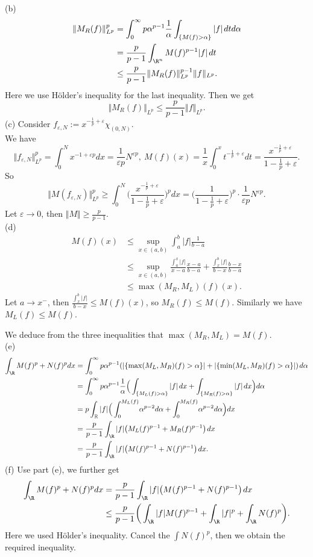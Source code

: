 \begin{itemize}
(b)
\begin{align*}
\Vert M_R(f)\Vert_{L^p}^p
&=\int_0^\infty p\alpha^{p-1}\frac1\alpha\int_{\{M(f)>\alpha\}}\vert f\vert\>dtd\alpha\\
&=\frac{p}{p-1}\int_{\R^n} M(f)^{p-1}\vert f\vert\>dt\\
&\leq \frac{p}{p-1}\Vert M_R(f)\Vert_{L^p}^{p-1}\Vert f\Vert_{L^p}.
\end{align*}
Here we use Hölder's inequality for the last inequality. Then we get $$\Vert M_R(f)\Vert_{L^p}\leq \frac{p}{p-1}\Vert f\Vert_{L^p}.$$
(c) Consider $f_{\varepsilon,N}:=x^{-\frac1p+\varepsilon}\chi_{(0,N)}.$\\
We have 
$$\Vert f_{\varepsilon,N}\Vert_{L^p}^p=\int_0^N x^{-1+\varepsilon p}dx=\frac1{\varepsilon p}N^{\varepsilon p},
\ M(f)(x)=\frac1x\int_0^xt^{-\frac1p+\varepsilon}dt
=\frac{x^{-\frac1p+\varepsilon}}{1-\frac1p+\varepsilon}.$$
So
$$\Vert M(f_{\varepsilon,N})\Vert_{L^p}^p
\geq \int_0^N\Big(\frac{x^{-\frac1p+\varepsilon}}{1-\frac1p+\varepsilon}\Big)^pdx
=\Big(\frac{1}{{1-\frac1p+\varepsilon}}\Big)^p\cdot \frac1{\varepsilon p}N^{\varepsilon p}.$$
Let $\varepsilon\rightarrow 0$, then $\Vert M\Vert\geq\frac{p}{p-1}.$\\
(d)
\begin{align*}
M(f)(x)
&\leq\sup\limits_{x\in(a,b)}\int_a^b\vert f\vert\frac{1}{b-a}\\
&\leq\sup\limits_{x\in(a,b)}\frac{\int_a^x\vert f\vert}{x-a}\frac{x-a}{b-a}+\frac{\int_x^b\vert f\vert}{b-x}\frac{b-x}{b-a}\\
&\leq \max(M_R,M_L)(f)(x).
\end{align*}
Let $a\rightarrow x^{-}$, then $\frac{\int_x^b\vert f\vert}{b-x}\leq M(f)(x)$, 
so $M_R(f)\leq M(f)$. Similarly we have $M_L(f)\leq M(f)$. 

We deduce from the three inequalities that $\max(M_R,M_L)=M(f)$.\\
(e)
\begin{align*}
\int_\R M(f)^p+N(f)^pdx&=\int_0^\infty p\alpha^{p-1}(\vert\{\max(M_L,M_R)(f)>\alpha\}\vert+\vert\{\min(M_L,M_R)(f)>\alpha\}\vert)\>d\alpha\\
&=\int_0^\infty p\alpha^{p-1}\frac1\alpha\Big(\int_{\{M_L(f)>\alpha\}}\vert f\vert\>dx+\int_{\{M_R(f)>\alpha\}}\vert f\vert\>dx\Big)d\alpha\\
&=p\int_{\mathbb{R}}\vert f\vert\Big(\int_0^{M_L(f)}\!\alpha^{p-2}d\alpha+\int_0^{M_R(f)}\!\alpha^{p-2}d\alpha\Big)dx\\
&=\frac{p}{p-1}\int_\R \vert f\vert\big(M_L(f)^{p-1}+M_R(f)^{p-1}\big)\>dx\\
&=\frac{p}{p-1}\int_\R\vert f\vert \big(M(f)^{p-1}+N(f)^{p-1}\big)\>dx.
\end{align*}
(f) Use part (e), we further get
\begin{align*}
    \int_\R M(f)^p+N(f)^pdx
    &= \frac{p}{p-1}\int_\R \vert f\vert\big(M(f)^{p-1}+N(f)^{p-1}\big)\>dx\\
    &\leq\frac{p}{p-1}\bigg(\int_\R \vert f\vert M(f)^{p-1}
    +\int_\R \vert f\vert^p+\int_\R N(f)^p\bigg).
\end{align*}
Here we used Hölder's inequality. Cancel the $\int N(f)^p$, 
then we obtain the required inequality.


\end{itemize}
